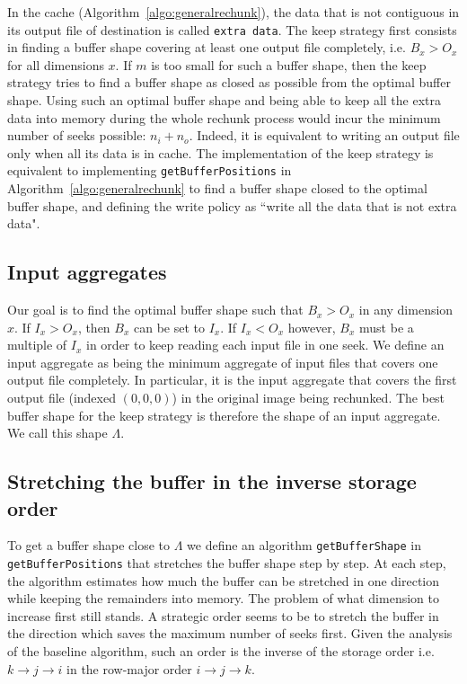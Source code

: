 \documentclass[conference]{IEEEtran}
\begin{document}
In the cache (Algorithm~\ref{algo:generalrechunk}), the data that is not
contiguous in its output file of destination is called \texttt{extra data}.
The keep strategy first consists in finding a buffer shape covering at least
one output file completely, i.e. $B_x>O_x$ for all dimensions $x$. If $m$ is too
small for such a buffer shape, then the keep strategy tries to find a buffer
shape as closed as possible from the optimal buffer shape. Using such an optimal
buffer shape and being able to keep all the extra data into memory during the
whole rechunk process would incur the minimum number of seeks possible: $n_i + n_o$.
Indeed, it is equivalent to writing an output file only when all its data is in
cache.
The implementation of the keep strategy is equivalent to implementing
\texttt{getBufferPositions} in Algorithm~\ref{algo:generalrechunk} to find a
buffer shape closed to the optimal buffer shape, and defining the write policy
as ``write all the data that is not extra data".

\subsection{Input aggregates}
Our goal is to find the optimal buffer shape such that $B_x>O_x$ in any dimension $x$.
If $I_x > O_x$, then $B_x$ can be set to $I_x$. If $I_x < O_x$ however, $B_x$
must be a multiple of $I_x$ in order to keep reading each input file in one seek.
We define an input aggregate as being the minimum aggregate of input files that
covers one output file completely. In particular, it is the input aggregate that
covers the first output file (indexed $(0,0,0)$) in the original image being
rechunked. The best buffer shape for the keep strategy is therefore the shape of
an input aggregate. We call this shape $\Lambda$.

\subsection{Stretching the buffer in the inverse storage order}
To get a buffer shape close to $\Lambda$ we define an algorithm
\texttt{getBufferShape} in \texttt{getBufferPositions} that stretches the
buffer shape step by step. At each step, the algorithm estimates how much the
buffer can be stretched in one direction while keeping the remainders into
memory. The problem of what dimension to increase first still stands. A
strategic order seems to be to stretch the buffer in the direction which saves
the maximum number of seeks first. Given the analysis of the baseline algorithm,
such an order is the inverse of the storage order i.e.
$k \rightarrow j \rightarrow i$ in the row-major order
$i \rightarrow j \rightarrow k$.
\end{document}
